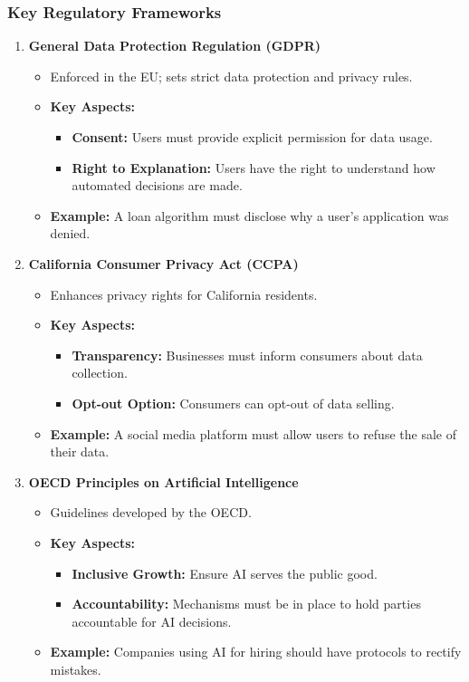 \documentclass[aspectratio=169]{beamer}
\begin{document}
\begin{frame}[fragile]
    \frametitle{Key Regulatory Frameworks}
    \begin{enumerate}
        \item \textbf{General Data Protection Regulation (GDPR)}
        \begin{itemize}
            \item Enforced in the EU; sets strict data protection and privacy rules.
            \item \textbf{Key Aspects:}
            \begin{itemize}
                \item \textbf{Consent:} Users must provide explicit permission for data usage.
                \item \textbf{Right to Explanation:} Users have the right to understand how automated decisions are made.
            \end{itemize}
            \item \textbf{Example:} A loan algorithm must disclose why a user's application was denied.
        \end{itemize}
        
        \item \textbf{California Consumer Privacy Act (CCPA)}
        \begin{itemize}
            \item Enhances privacy rights for California residents.
            \item \textbf{Key Aspects:}
            \begin{itemize}
                \item \textbf{Transparency:} Businesses must inform consumers about data collection.
                \item \textbf{Opt-out Option:} Consumers can opt-out of data selling.
            \end{itemize}
            \item \textbf{Example:} A social media platform must allow users to refuse the sale of their data.
        \end{itemize}

        \item \textbf{OECD Principles on Artificial Intelligence}
        \begin{itemize}
            \item Guidelines developed by the OECD.
            \item \textbf{Key Aspects:}
            \begin{itemize}
                \item \textbf{Inclusive Growth:} Ensure AI serves the public good.
                \item \textbf{Accountability:} Mechanisms must be in place to hold parties accountable for AI decisions.
            \end{itemize}
            \item \textbf{Example:} Companies using AI for hiring should have protocols to rectify mistakes.
        \end{itemize}
    \end{enumerate}
\end{frame}
\end{document}
